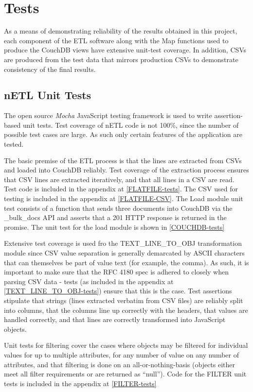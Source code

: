 \section{Tests}
As a means of demonstrating reliability of the results obtained in this project, each component of the ETL software along with the Map functions used to produce the CouchDB views have extensive unit-test coverage. In addition, CSVs are produced from the test data that mirrors production CSVs to demonstrate consistency of the final results.

\subsection{nETL Unit Tests}
The open source \textit{Mocha} JavaScript \cite{mochaTest} testing framework is used to write assertion-based unit tests. Test coverage of nETL code is not 100\%, since the number of possible test cases are large. As such only certain features of the application are tested.

The basic premise of the ETL process is that the lines are extracted from CSVs and loaded into CouchDB reliably. Test coverage of the extraction process ensures that CSV lines are extracted iteratively, and that all lines in a CSV are read. Test code is included in the appendix at \ref{FLATFILE-tests}. The CSV used for testing is included in the appendix at \ref{FLATFILE-CSV}. The Load module unit test consists of a function that sends three documents into CouchDB via the \_bulk\_docs API and asserts that a 201 HTTP response is returned in the promise. The unit test for the load module is shown in \ref{COUCHDB-tests}

Extensive test coverage is used fro the TEXT\_LINE\_TO\_OBJ transformation module since CSV value separation is generally demarcated by ASCII characters that can themselves be part of value text (for example, the comma). As such, it is important to make sure that the RFC 4180 spec is adhered to closely when parsing CSV data - tests (as included in the appendix at \ref{TEXT_LINE_TO_OBJ-tests}) ensure that this is the case. Test assertions stipulate that strings (lines extracted verbatim from CSV files) are reliably split into columns, that the columns line up correctly with the headers, that values are handled correctly, and that lines are correctly transformed into JavaScript objects.

Unit tests for filtering cover the cases where objects may be filtered for individual values for up to multiple attributes, for any number of value on any number of attributes, and that filtering is done on an all-or-nothing-basis (objects either meet all filter requirements or are returned as ``null''). Code for the FILTER unit tests is included in the appendix at \ref{FILTER-tests}

